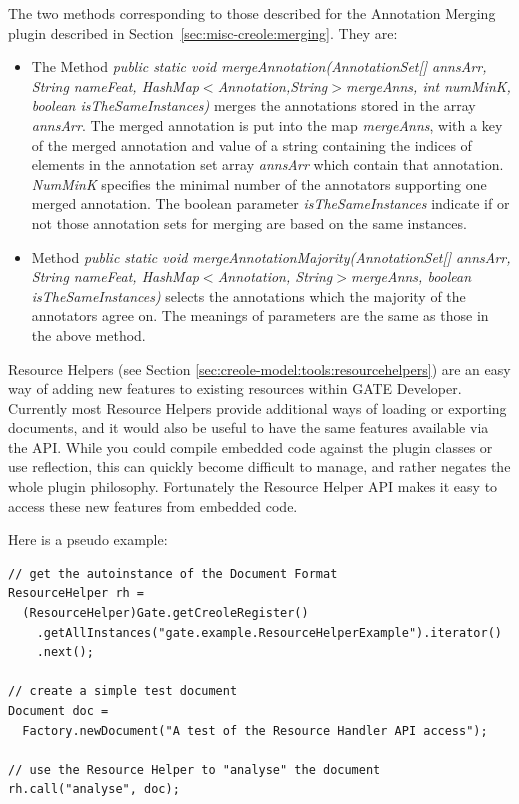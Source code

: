 The two methods corresponding to those described for the Annotation Merging
plugin described in Section~\ref{sec:misc-creole:merging}. They are:

\begin{itemize}

\item The Method {\em public static void mergeAnnotation(AnnotationSet[]
    annsArr, String nameFeat, HashMap$<$Annotation,String$>$mergeAnns, int
    numMinK, boolean isTheSameInstances)} merges the annotations stored in the
  array {\em annsArr}. The merged annotation is put into the map {\em
    mergeAnns}, with a key of the merged annotation and value of a string
  containing the indices of elements in the annotation set array {\em annsArr}
  which contain that annotation.  {\em NumMinK} specifies the minimal number
  of the annotators supporting one merged annotation. The boolean parameter
  {\em isTheSameInstances} indicate if or not those annotation sets for
  merging are based on the same instances.

\item Method {\em public static void mergeAnnotationMajority(AnnotationSet[]
    annsArr, String nameFeat, HashMap$<$Annotation, String$>$mergeAnns,
    boolean isTheSameInstances)} selects the annotations which the majority of
  the annotators agree on. The meanings of parameters are the same as those in
  the above method.


\end{itemize}

Resource Helpers (see Section \ref{sec:creole-model:tools:resourcehelpers})
are an easy way of adding new features to existing resources within GATE
Developer. Currently most Resource Helpers provide additional ways of loading
or exporting documents, and it would also be useful to have the same features
available via the API. While you could compile embedded code against the plugin
classes or use reflection, this can quickly become difficult to manage, and
rather negates the whole plugin philosophy. Fortunately the Resource Helper
API makes it easy to access these new features from embedded code.

Here is a pseudo example:

\begin{lstlisting}
// get the autoinstance of the Document Format
ResourceHelper rh =
  (ResourceHelper)Gate.getCreoleRegister()
    .getAllInstances("gate.example.ResourceHelperExample").iterator()
    .next();

// create a simple test document
Document doc =
  Factory.newDocument("A test of the Resource Handler API access");

// use the Resource Helper to "analyse" the document
rh.call("analyse", doc);
\end{lstlisting}

